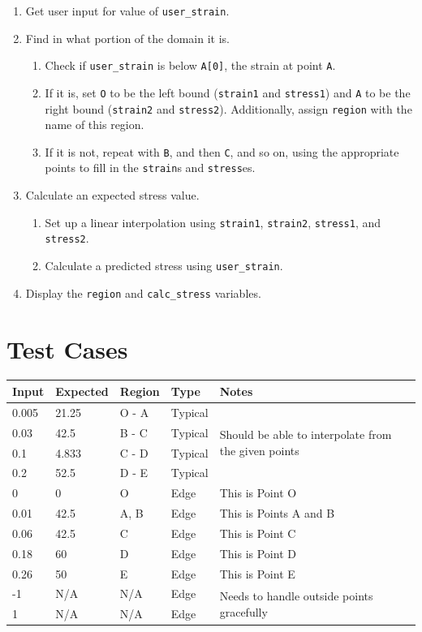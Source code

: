 \documentclass{article}
\begin{document}
\begin{enumerate}
	\item Get user input for value of \verb/user_strain/.
	\item Find in what portion of the domain it is.
		\begin{enumerate}
			\item Check if \verb/user_strain/ is below \verb/A[0]/, the strain at point \verb/A/.
			\item If it is, set \verb/O/ to be the left bound (\verb/strain1/ and \verb/stress1/) and \verb/A/ to be the right bound (\verb/strain2/ and \verb/stress2/). Additionally, assign \verb/region/ with the name of this region.
			\item If it is not, repeat with \verb/B/, and then \verb/C/, and so on, using the appropriate points to fill in the \verb/strain/s and \verb/stress/es.
		\end{enumerate}
	\item Calculate an expected stress value.
		\begin{enumerate}
			\item Set up a linear interpolation using \verb/strain1/, \verb/strain2/, \verb/stress1/, and \verb/stress2/.
			\item Calculate a predicted stress using \verb/user_strain/.
		\end{enumerate}
	\item Display the \verb/region/ and \verb/calc_stress/ variables. 
\end{enumerate}

\section{Test Cases}

\begin{tabular}{p{}|p{}|p{}|p{}|p{}}
	Input & Expected & Region & Type & Notes \\ \hline \hline
	0.005 & 21.25 & O - A & Typical & \multirow{4}{*}{Should be able to interpolate from the given points} \\ \cline{0-3}
	0.03 & 42.5 & B - C & Typical & \\ \cline{0-3}
	0.1 & 4.833 & C - D & Typical & \\ \cline{0-3}
	0.2 & 52.5 & D - E & Typical & \\ \hline
	0 & 0 & O & Edge & This is Point O \\ \hline
	0.01 & 42.5 & A, B & Edge & This is Points A and B \\ \hline
	0.06 & 42.5 & C & Edge & This is Point C \\ \hline
	0.18 & 60 & D & Edge & This is Point D \\ \hline
	0.26 & 50 & E & Edge & This is Point E \\ \hline
	-1 & N/A & N/A & Edge & \multirow{2}{*}{Needs to handle outside points gracefully} \\ \cline{0-3}
	1 & N/A & N/A & Edge & \\
\end{tabular}
\end{document}
